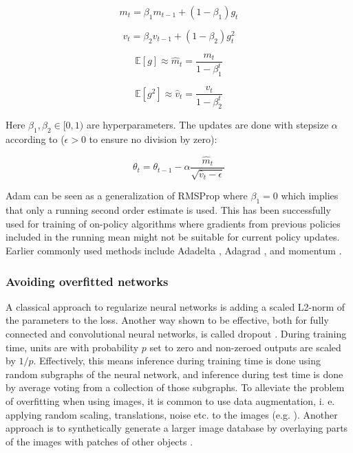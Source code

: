 \begin{equation}
    m_t = \beta_1 m_{t-1} + (1 - \beta_1) g_t
\end{equation}

\begin{equation}
    v_t = \beta_2 v_{t-1} + (1 - \beta_2) g_t^2
\end{equation}

\begin{equation}
    \mathbb{E}\left[g \right] \approx \hat{m}_t = \frac{m_t}{1- \beta_1^t}
\end{equation}

\begin{equation}
    \mathbb{E}\left[g^2 \right] \approx \hat{v}_t = \frac{v_t}{1- \beta_2^t}
\end{equation}

Here $\beta_1, \beta_2 \in [0, 1)$ are hyperparameters. The updates are done
with stepsize $\alpha$ according to ($\epsilon >0$ to ensure no division by zero):

\begin{equation}
    \theta_t = \theta_{t-1} - \alpha \frac{\hat{m}_t}{\sqrt{\hat{v}_t - \epsilon}}
\end{equation}

Adam can be seen as a generalization of RMSProp where $\beta_1 = 0$
\cite{tieleman2012lecture} which implies that only a running second order
estimate is used. This has been successfully used for training of on-policy
algorithms \cite{mnih2016asynchronous} where gradients from previous policies
included in the running mean might not be suitable for current policy updates.
Earlier commonly used methods include Adadelta \cite{zeiler2012adadelta},
Adagrad \cite{duchi2011adaptive}, and momentum \cite{qian1999momentum}.


\subsubsection{Avoiding overfitted networks}

A classical approach to regularize neural networks is adding a scaled L2-norm
of the parameters to the loss. Another way shown to be effective, both for
fully connected and convolutional neural networks, is called dropout
\cite{srivastava2014dropout}. During training time, units are with probability
$p$ set to zero and non-zeroed outputs are scaled by $1/p$. Effectively, this
means inference during training time is done using random subgraphs of the
neural network, and inference during test time is done by average voting from a
collection of those subgraphs. To alleviate the problem of overfitting when
using images, it is common to use data augmentation, i. e. applying random
scaling, translations, noise etc. to the images (e.g.
\cite{ciregan2012multi,simard2003best,krizhevsky2012imagenet}). Another
approach is to synthetically generate a larger image database by overlaying
parts of the images with patches of other objects \cite{ghadirzadeh2017deep}.

